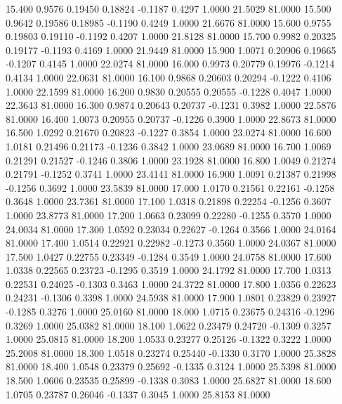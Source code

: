   15.400   0.9576   0.19450   0.18824  -0.1187   0.4297   1.0000  21.5029  81.0000
  15.500   0.9642   0.19586   0.18985  -0.1190   0.4249   1.0000  21.6676  81.0000
  15.600   0.9755   0.19803   0.19110  -0.1192   0.4207   1.0000  21.8128  81.0000
  15.700   0.9982   0.20325   0.19177  -0.1193   0.4169   1.0000  21.9449  81.0000
  15.900   1.0071   0.20906   0.19665  -0.1207   0.4145   1.0000  22.0274  81.0000
  16.000   0.9973   0.20779   0.19976  -0.1214   0.4134   1.0000  22.0631  81.0000
  16.100   0.9868   0.20603   0.20294  -0.1222   0.4106   1.0000  22.1599  81.0000
  16.200   0.9830   0.20555   0.20555  -0.1228   0.4047   1.0000  22.3643  81.0000
  16.300   0.9874   0.20643   0.20737  -0.1231   0.3982   1.0000  22.5876  81.0000
  16.400   1.0073   0.20955   0.20737  -0.1226   0.3900   1.0000  22.8673  81.0000
  16.500   1.0292   0.21670   0.20823  -0.1227   0.3854   1.0000  23.0274  81.0000
  16.600   1.0181   0.21496   0.21173  -0.1236   0.3842   1.0000  23.0689  81.0000
  16.700   1.0069   0.21291   0.21527  -0.1246   0.3806   1.0000  23.1928  81.0000
  16.800   1.0049   0.21274   0.21791  -0.1252   0.3741   1.0000  23.4141  81.0000
  16.900   1.0091   0.21387   0.21998  -0.1256   0.3692   1.0000  23.5839  81.0000
  17.000   1.0170   0.21561   0.22161  -0.1258   0.3648   1.0000  23.7361  81.0000
  17.100   1.0318   0.21898   0.22254  -0.1256   0.3607   1.0000  23.8773  81.0000
  17.200   1.0663   0.23099   0.22280  -0.1255   0.3570   1.0000  24.0034  81.0000
  17.300   1.0592   0.23034   0.22627  -0.1264   0.3566   1.0000  24.0164  81.0000
  17.400   1.0514   0.22921   0.22982  -0.1273   0.3560   1.0000  24.0367  81.0000
  17.500   1.0427   0.22755   0.23349  -0.1284   0.3549   1.0000  24.0758  81.0000
  17.600   1.0338   0.22565   0.23723  -0.1295   0.3519   1.0000  24.1792  81.0000
  17.700   1.0313   0.22531   0.24025  -0.1303   0.3463   1.0000  24.3722  81.0000
  17.800   1.0356   0.22623   0.24231  -0.1306   0.3398   1.0000  24.5938  81.0000
  17.900   1.0801   0.23829   0.23927  -0.1285   0.3276   1.0000  25.0160  81.0000
  18.000   1.0715   0.23675   0.24316  -0.1296   0.3269   1.0000  25.0382  81.0000
  18.100   1.0622   0.23479   0.24720  -0.1309   0.3257   1.0000  25.0815  81.0000
  18.200   1.0533   0.23277   0.25126  -0.1322   0.3222   1.0000  25.2008  81.0000
  18.300   1.0518   0.23274   0.25440  -0.1330   0.3170   1.0000  25.3828  81.0000
  18.400   1.0548   0.23379   0.25692  -0.1335   0.3124   1.0000  25.5398  81.0000
  18.500   1.0606   0.23535   0.25899  -0.1338   0.3083   1.0000  25.6827  81.0000
  18.600   1.0705   0.23787   0.26046  -0.1337   0.3045   1.0000  25.8153  81.0000

